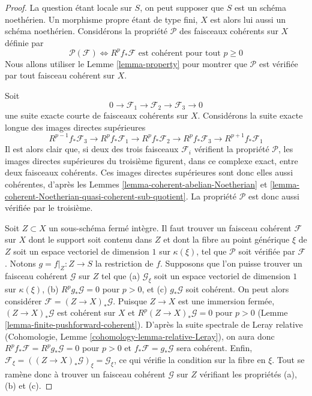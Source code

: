 \begin{proof}
La question étant locale sur $S$, on peut supposer que $S$ est
un schéma noethérien. Un morphisme propre étant de type fini,
$X$ est alors lui aussi un schéma noethérien.
Considérons la propriété $\mathcal{P}$ des faisceaux cohérents
sur $X$ définie par
$$
\mathcal{P}(\mathcal{F}) \Leftrightarrow
R^pf_*\mathcal{F}\text{ est cohérent pour tout }p \geq 0
$$
Nous allons utiliser le
Lemme \ref{lemma-property} pour montrer que
$\mathcal{P}$ est vérifiée par tout faisceau cohérent sur $X$.

\medskip\noindent
Soit
$$
0 \to \mathcal{F}_1 \to \mathcal{F}_2 \to \mathcal{F}_3 \to 0
$$
une suite exacte courte de faisceaux cohérents sur $X$.
Considérons la suite exacte longue des images directes supérieures
$$
R^{p - 1}f_*\mathcal{F}_3 \to
R^pf_*\mathcal{F}_1 \to
R^pf_*\mathcal{F}_2 \to
R^pf_*\mathcal{F}_3 \to
R^{p + 1}f_*\mathcal{F}_1
$$
Il est alors clair que, si deux des trois faisceaux $\mathcal{F}_i$
vérifient la propriété $\mathcal{P}$, les images directes supérieures du
troisième figurent, dans ce complexe exact, entre deux faisceaux
cohérents. Ces images directes supérieures sont donc elles aussi cohérentes, d'après les
Lemmes \ref{lemma-coherent-abelian-Noetherian} et
\ref{lemma-coherent-Noetherian-quasi-coherent-sub-quotient}.
La propriété $\mathcal{P}$ est donc aussi vérifiée par le troisième.

\medskip\noindent
Soit $Z \subset X$ un sous-schéma fermé intègre.
Il faut trouver un faisceau cohérent $\mathcal{F}$ sur $X$ dont le support
soit contenu dans $Z$ et dont la fibre au point générique $\xi$ de $Z$ soit un
espace vectoriel de dimension $1$ sur $\kappa(\xi)$, tel que $\mathcal{P}$
soit vérifiée par $\mathcal{F}$. Notons $g = f|_Z : Z \to S$ la restriction de $f$.
Supposons que l'on puisse trouver un faisceau cohérent $\mathcal{G}$ sur $Z$
tel que
(a) $\mathcal{G}_\xi$ soit un espace vectoriel de dimension $1$ sur $\kappa(\xi)$,
(b) $R^pg_*\mathcal{G} = 0$ pour $p > 0$, et
(c) $g_*\mathcal{G}$ soit cohérent. On peut alors considérer
$\mathcal{F} = (Z \to X)_*\mathcal{G}$. Puisque $Z \to X$ est une immersion fermée,
$(Z \to X)_*\mathcal{G}$ est cohérent sur $X$
et $R^p(Z \to X)_*\mathcal{G} = 0$ pour $p > 0$
(Lemme \ref{lemma-finite-pushforward-coherent}).
D'après la suite spectrale de Leray relative
(Cohomologie, Lemme \ref{cohomology-lemma-relative-Leray}),
on aura donc $R^pf_*\mathcal{F} = R^pg_*\mathcal{G} = 0$ pour $p > 0$
et $f_*\mathcal{F} = g_*\mathcal{G}$ sera cohérent.
Enfin, $\mathcal{F}_\xi = ((Z \to X)_*\mathcal{G})_\xi = \mathcal{G}_\xi$,
ce qui vérifie la condition sur la fibre en $\xi$.
Tout se ramène donc à trouver un faisceau cohérent $\mathcal{G}$
sur $Z$ vérifiant les propriétés (a), (b) et (c).


\end{proof}
